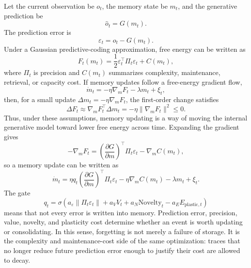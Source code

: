 \documentclass[11pt, a4paper]{article}
\begin{document}
Let the current observation be $o_t$, the memory state be $m_t$, and the generative prediction be
\begin{equation}
\hat o_t
=
G(m_t).
\end{equation}
The prediction error is
\begin{equation}
\varepsilon_t
=
o_t-G(m_t).
\end{equation}
Under a Gaussian predictive-coding approximation, free energy can be written as
\begin{equation}
F_t(m_t)
=
\frac{1}{2}\varepsilon_t^\top\Pi_t\varepsilon_t
+
C(m_t),
\end{equation}
where $\Pi_t$ is precision and $C(m_t)$ summarizes complexity, maintenance, retrieval, or capacity cost. If memory updates follow a free-energy gradient flow,
\begin{equation}
\dot m_t
=
-\eta\nabla_m F_t
-
\lambda m_t
+
\xi_t,
\end{equation}
then, for a small update $\Delta m_t=-\eta\nabla_mF_t$, the first-order change satisfies
\begin{equation}
\Delta F_t
\approx
\nabla_mF_t^\top\Delta m_t
=
-\eta\lVert\nabla_mF_t\rVert^2
\le
0.
\end{equation}
Thus, under these assumptions, memory updating is a way of moving the internal generative model toward lower free energy across time. Expanding the gradient gives
\begin{equation}
-\nabla_m F_t
=
\left(\frac{\partial G}{\partial m}\right)^\top
\Pi_t\varepsilon_t
-
\nabla_m C(m_t),
\end{equation}
so a memory update can be written as
\begin{equation}
\dot m_t
=
\eta q_t
\left(\frac{\partial G}{\partial m}\right)^\top
\Pi_t\varepsilon_t
-
\eta\nabla_m C(m_t)
-
\lambda m_t
+
\xi_t.
\end{equation}
The gate
\begin{equation}
q_t
=
\sigma\left(
a_\varepsilon\lVert\Pi_t\varepsilon_t\rVert
+
a_VV_t
+
a_N\mathrm{Novelty}_t
-
a_EE_{\mathrm{plastic},t}
\right)
\end{equation}
means that not every error is written into memory. Prediction error, precision, value, novelty, and plasticity cost determine whether an event is worth updating or consolidating. In this sense, forgetting is not merely a failure of storage. It is the complexity and maintenance-cost side of the same optimization: traces that no longer reduce future prediction error enough to justify their cost are allowed to decay.
\end{document}
